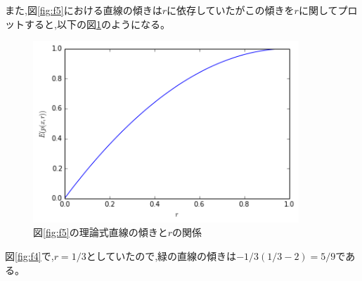 また,図\ref{fig:f5}における直線の傾きは$r$に依存していたがこの傾きを$r$に関してプロットすると,以下の図\ref{fig:f7}のようになる。

\begin{figure}[H]
    \begin{center}
        \includegraphics[width=10cm]{../download2_5.png}
        \caption{図\ref{fig:f5}の理論式直線の傾きと$r$の関係}
        \label{fig:f7}
    \end{center}
\end{figure}

図\ref{fig:f4}で,$r=1/3$としていたので,緑の直線の傾きは$-1/3(1/3-2) = 5/9$である。
